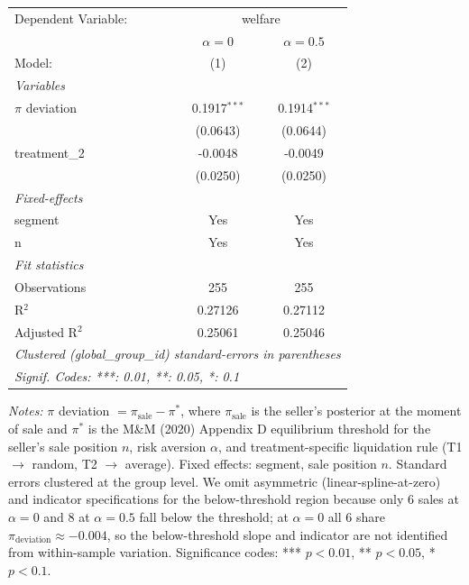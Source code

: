 
\begingroup
\centering
\scriptsize
\begin{tabular}{lcc}
   \tabularnewline \midrule \midrule
   Dependent Variable: & \multicolumn{2}{c}{welfare}\\
                    & $\alpha=0$     & $\alpha=0.5$ \\    
   Model:           & (1)            & (2)\\  
   \midrule
   \emph{Variables}\\
   $\pi$ deviation  & 0.1917$^{***}$ & 0.1914$^{***}$\\   
                    & (0.0643)       & (0.0644)\\   
   treatment\_2     & -0.0048        & -0.0049\\   
                    & (0.0250)       & (0.0250)\\   
   \midrule
   \emph{Fixed-effects}\\
   segment          & Yes            & Yes\\  
   n                & Yes            & Yes\\  
   \midrule
   \emph{Fit statistics}\\
   Observations     & 255            & 255\\  
   R$^2$            & 0.27126        & 0.27112\\  
   Adjusted R$^2$   & 0.25061        & 0.25046\\  
   \midrule \midrule
   \multicolumn{3}{l}{\emph{Clustered (global\_group\_id) standard-errors in parentheses}}\\
   \multicolumn{3}{l}{\emph{Signif. Codes: ***: 0.01, **: 0.05, *: 0.1}}\\
\end{tabular}
 
\par \raggedright 
\textit{Notes:} $\pi$ deviation $= \pi_\text{sale} - \pi^*$, where $\pi_\text{sale}$ is the seller's posterior at the moment of sale and $\pi^*$ is the M\&M (2020) Appendix D equilibrium threshold for the seller's sale position $n$, risk aversion $\alpha$, and treatment-specific liquidation rule (T1 $\to$ random, T2 $\to$ average). Fixed effects: segment, sale position $n$. Standard errors clustered at the group level. We omit asymmetric (linear-spline-at-zero) and indicator specifications for the below-threshold region because only 6 sales at $\alpha=0$ and 8 at $\alpha=0.5$ fall below the threshold; at $\alpha=0$ all 6 share $\pi_\text{deviation} \approx -0.004$, so the below-threshold slope and indicator are not identified from within-sample variation. Significance codes: *** $p<0.01$, ** $p<0.05$, * $p<0.1$.
\par\endgroup


